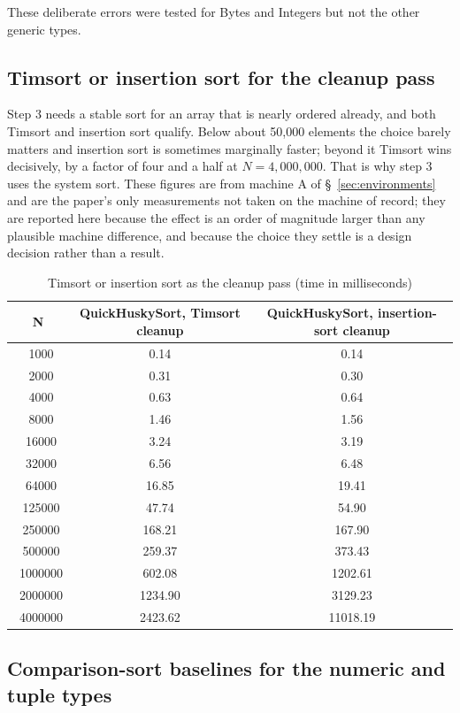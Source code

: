 \documentclass[twoside,leqno,twocolumn]{article}
\begin{document}
These deliberate errors were tested for Bytes and Integers but not the other generic types.

\subsection{Timsort or insertion sort for the cleanup pass}
\label{sec:cleanup-choice}

Step 3 needs a stable sort for an array that is nearly ordered already, and both Timsort and insertion
sort qualify.
Below about 50,000 elements the choice barely matters and insertion sort is sometimes marginally
faster; beyond it Timsort wins decisively, by a factor of four and a half at $N = 4{,}000{,}000$.
That is why step 3 uses the system sort.
These figures are from machine A of \S~\ref{sec:environments} and are the paper's only measurements not
taken on the machine of record; they are reported here because the effect is an order of magnitude
larger than any plausible machine difference, and because the choice they settle is a design decision
rather than a result.

\begin{table}
  \caption{Timsort or insertion sort as the cleanup pass (time in milliseconds)}
  \label{tab:TimvsInsertion}
  \begin{tabular}{ccc}
    \toprule
    N & QuickHuskySort, Timsort cleanup & QuickHuskySort, insertion-sort cleanup \\
    \midrule
    \ 1000&0.14&0.14 \\
\ 2000&0.31&0.30 \\
\ 4000&0.63&0.64 \\
\ 8000&1.46&1.56 \\
\ 16000&3.24&3.19 \\
\ 32000&6.56&6.48 \\
\ 64000&16.85&19.41 \\
\ 125000&47.74&54.90 \\
\ 250000&168.21&167.90 \\
\ 500000&259.37&373.43 \\
\ 1000000&602.08&1202.61 \\
\ 2000000&1234.90&3129.23 \\
\ 4000000&2423.62&11018.19 \\

    \bottomrule
  \end{tabular}
\end{table}

\subsection{Comparison-sort baselines for the numeric and tuple types}
\label{sec:comparison-baselines}
\end{document}
